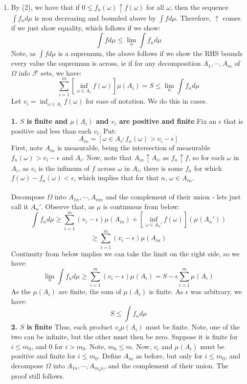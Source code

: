\documentclass[12pt,a4paper]{article}
\newcommand{\1}[1]{\mathbbm{1}\left\{ #1 \right\}}
\newcommand{\fcal}{\mathcal{F}}
\begin{document}
\begin{enumerate}
	\item By (2), we have that if $0 \leq f_n(\omega) \uparrow f(\omega)$ for all $\omega$, then the sequence $\int f_n d\mu$ is non decreasing and bounded above by $\int f d\mu$. Therefore, $\uparrow$ comes if we just show equality, which follows if we show:
	$$
		\int f d\mu \leq \lim_n \int f_n d\mu
	$$
	Note, as $\int f d\mu$ is a supremum, the above follows if we show the RHS bounds every value the supremum is across, ie if for any decomposition $A_1, \cdots, A_m$ of $\Omega$ info $\fcal$ sets, we have:
	$$
		\sum_{i=1}^m \left[\inf_{\omega \in A_i} f(\omega)\right]\mu(A_i) = S \leq \lim_n \int f_n d\mu
	$$
	Let $v_i = \inf_{\omega \in A_i} f(\omega)$ for ease of notation. We do this in cases.
	\\\\
	\textbf{1. $S$ is finite and $\mu(A_i)$ and $v_i$ are positive and finite} Fix an $\epsilon$ that is positive and less than each $v_i$. Put:
	$$
		A_{in} = \left[\omega \in A_i : f_n(\omega) > v_i - \epsilon\right]
	$$
	First, note $A_{in}$ is measurable, being the intersection of measurable $f_n(\omega) > v_i - \epsilon$ and $A_i$. Now, note that $A_{in} \uparrow A_i$, as $f_n \uparrow f$, so for each $\omega$ in $A_i$, as $v_i$ is the infimum of $f$ across $\omega$ in $A_i$, there is some $f_n$ for which $f(\omega) - f_n(\omega) < \epsilon$, which implies that for that $n$, $\omega \in A_{in}$.
	\\\\
	Decompose $\Omega$ into $A_{1n}, \cdots, A_{mn}$ and the complement of their union - lets just call it $A_n'$. Observe that, as $\mu$ is continuous from below:
	$$
		\int f_n d\mu \geq \sum_{i=1}^m (v_i - \epsilon) \mu(A_{in}) + \left[\inf_{\omega \in A_n'} f(\omega)\right](\mu(A_n'))
	$$
	$$
		\geq \sum_{i=1}^m (v_i - \epsilon) \mu(A_{in})
	$$
	Continuity from below implies we can take the limit on the right side, so we have:
	$$
		\lim_n \int f_n d\mu \geq \sum_{i=1}^m (v_i - \epsilon) \mu(A_i) = S - \epsilon \sum_{i=1}^m \mu(A_i)
	$$
	As the $\mu(A_i)$ are finite, the sum of $\mu(A_i)$ is finite. As $\epsilon$ was arbitrary, we have:
	$$
		S \leq \int f_n d\mu
	$$
	\textbf{2. $S$ is finite} Thus, each product $v_i \mu(A_i)$ must be finite. Note, one of the two can be infinite, but the other must then be zero. Suppose it is finite for $i \leq m_0$, and $0$ for $i > m_0$. Note, $m_0 \leq m$. Now, $v_i$ and $\mu(A_i)$ must be positive and finite for $i \leq m_0$. Define $A_{in}$ as before, but only for $i \leq m_0$, and decompose $\Omega$ into $A_{1n}, \cdots, A_{m_0n}$, and the complement of their union. The proof still follows.

\end{enumerate}
\end{document}
